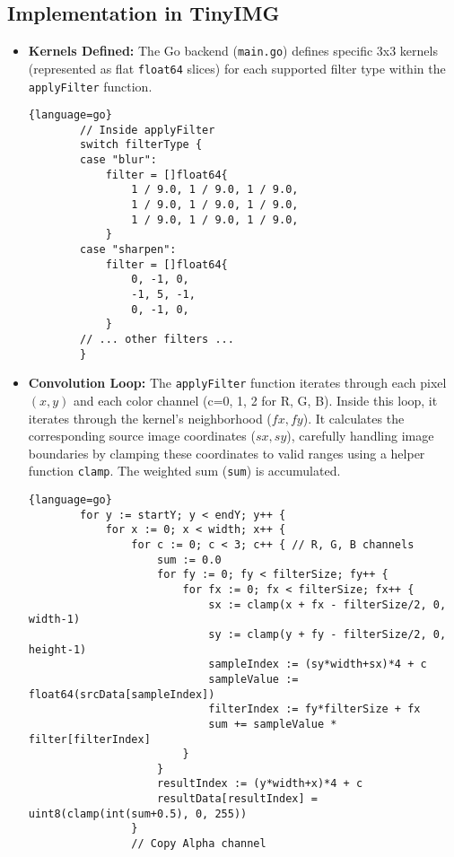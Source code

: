\documentclass{article}
\begin{document}
\subsection{Implementation in TinyIMG}
\begin{itemize}
    \item \textbf{Kernels Defined:} The Go backend (\texttt{main.go}) defines specific 3x3 kernels (represented as flat \texttt{float64} slices) for each supported filter type within the \texttt{applyFilter} function.
    \begin{lstlisting}{language=go}
        // Inside applyFilter
        switch filterType {
        case "blur":
            filter = []float64{
                1 / 9.0, 1 / 9.0, 1 / 9.0,
                1 / 9.0, 1 / 9.0, 1 / 9.0,
                1 / 9.0, 1 / 9.0, 1 / 9.0,
            }
        case "sharpen":
            filter = []float64{
                0, -1, 0,
                -1, 5, -1,
                0, -1, 0,
            }
        // ... other filters ...
        }
    \end{lstlisting}
    \item \textbf{Convolution Loop:} The \texttt{applyFilter} function iterates through each pixel $(x, y)$ and each color channel (c=0, 1, 2 for R, G, B). Inside this loop, it iterates through the kernel's neighborhood ($fx, fy$). It calculates the corresponding source image coordinates ($sx, sy$), carefully handling image boundaries by clamping these coordinates to valid ranges using a helper function \texttt{clamp}. The weighted sum (\texttt{sum}) is accumulated.
    \begin{lstlisting}{language=go}
        for y := startY; y < endY; y++ {
            for x := 0; x < width; x++ {
                for c := 0; c < 3; c++ { // R, G, B channels
                    sum := 0.0
                    for fy := 0; fy < filterSize; fy++ {
                        for fx := 0; fx < filterSize; fx++ {
                            sx := clamp(x + fx - filterSize/2, 0, width-1)
                            sy := clamp(y + fy - filterSize/2, 0, height-1)
                            sampleIndex := (sy*width+sx)*4 + c
                            sampleValue := float64(srcData[sampleIndex])
                            filterIndex := fy*filterSize + fx
                            sum += sampleValue * filter[filterIndex]
                        }
                    }
                    resultIndex := (y*width+x)*4 + c
                    resultData[resultIndex] = uint8(clamp(int(sum+0.5), 0, 255))
                }
                // Copy Alpha channel

\end{lstlisting}
\end{itemize}
\end{document}
